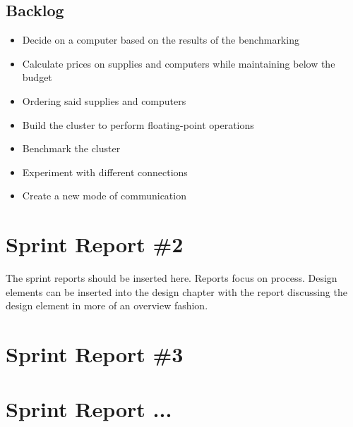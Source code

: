 \subsection*{Backlog}
\begin{itemize}
	\item Decide on a computer based on the results of the benchmarking
	\item Calculate prices on supplies and computers while maintaining below the budget
	\item Ordering said supplies and computers
	\item Build the cluster to perform floating-point operations
	\item Benchmark the cluster
	\item Experiment with different connections
	\item Create a new mode of communication
\end{itemize}

\section{Sprint Report \#2}
The sprint reports should be inserted here.     Reports focus on process.  Design elements can be inserted into the design chapter with the report discussing the design element in more of an overview fashion.
\section{Sprint Report \#3}

\section{Sprint Report ...}
